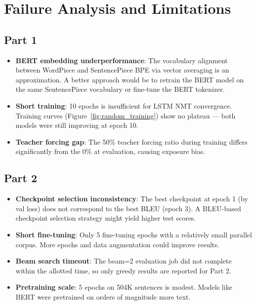 \documentclass[12pt,a4paper]{article}
\begin{document}
\section{Failure Analysis and Limitations}

\subsection{Part 1}

\begin{itemize}
    \item \textbf{BERT embedding underperformance}: The vocabulary alignment between WordPiece and SentencePiece BPE via vector averaging is an approximation. A better approach would be to retrain the BERT model on the same SentencePiece vocabulary or fine-tune the BERT tokenizer.
    \item \textbf{Short training}: 10 epochs is insufficient for LSTM NMT convergence. Training curves (Figure~\ref{fig:random_training}) show no plateau — both models were still improving at epoch 10.
    \item \textbf{Teacher forcing gap}: The 50\% teacher forcing ratio during training differs significantly from the 0\% at evaluation, causing exposure bias.
\end{itemize}

\subsection{Part 2}

\begin{itemize}
    \item \textbf{Checkpoint selection inconsistency}: The best checkpoint at epoch 1 (by val loss) does not correspond to the best BLEU (epoch 3). A BLEU-based checkpoint selection strategy might yield higher test scores.
    \item \textbf{Short fine-tuning}: Only 5 fine-tuning epochs with a relatively small parallel corpus. More epochs and data augmentation could improve results.
    \item \textbf{Beam search timeout}: The beam=2 evaluation job did not complete within the allotted time, so only greedy results are reported for Part 2.
    \item \textbf{Pretraining scale}: 5 epochs on 504K sentences is modest. Models like BERT were pretrained on orders of magnitude more text.
\end{itemize}
\end{document}
